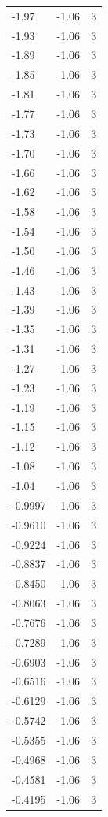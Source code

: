 \begin{longtable}{lrr}
  -1.97 & -1.06 & 3 \\
  -1.93 & -1.06 & 3 \\
  -1.89 & -1.06 & 3 \\
  -1.85 & -1.06 & 3 \\
  -1.81 & -1.06 & 3 \\
  -1.77 & -1.06 & 3 \\
  -1.73 & -1.06 & 3 \\
  -1.70 & -1.06 & 3 \\
  -1.66 & -1.06 & 3 \\
  -1.62 & -1.06 & 3 \\
  -1.58 & -1.06 & 3 \\
  -1.54 & -1.06 & 3 \\
  -1.50 & -1.06 & 3 \\
  -1.46 & -1.06 & 3 \\
  -1.43 & -1.06 & 3 \\
  -1.39 & -1.06 & 3 \\
  -1.35 & -1.06 & 3 \\
  -1.31 & -1.06 & 3 \\
  -1.27 & -1.06 & 3 \\
  -1.23 & -1.06 & 3 \\
  -1.19 & -1.06 & 3 \\
  -1.15 & -1.06 & 3 \\
  -1.12 & -1.06 & 3 \\
  -1.08 & -1.06 & 3 \\
  -1.04 & -1.06 & 3 \\
  -0.9997 & -1.06 & 3 \\
  -0.9610 & -1.06 & 3 \\
  -0.9224 & -1.06 & 3 \\
  -0.8837 & -1.06 & 3 \\
  -0.8450 & -1.06 & 3 \\
  -0.8063 & -1.06 & 3 \\
  -0.7676 & -1.06 & 3 \\
  -0.7289 & -1.06 & 3 \\
  -0.6903 & -1.06 & 3 \\
  -0.6516 & -1.06 & 3 \\
  -0.6129 & -1.06 & 3 \\
  -0.5742 & -1.06 & 3 \\
  -0.5355 & -1.06 & 3 \\
  -0.4968 & -1.06 & 3 \\
  -0.4581 & -1.06 & 3 \\
  -0.4195 & -1.06 & 3 \\

\end{longtable}
